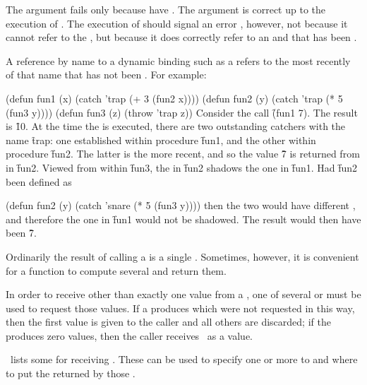 The argument fails only because  have 
.  The argument is correct up to the execution of
.  The execution of 
should signal an error , however, not
because it cannot refer to the , but because it
does correctly refer to an  and that 
 has been .

A reference by name to a dynamic  binding such as
a  refers to the most recently 
  of that name that has not been 
.  For example:

\code
 (defun fun1 (x)
   (catch 'trap (+ 3 (fun2 x))))
 (defun fun2 (y)
   (catch 'trap (* 5 (fun3 y))))
 (defun fun3 (z)
   (throw 'trap z))
\endcode
Consider the call \f{(fun1 7)}.  The result is \f{10}.  At the time
the  is executed, there are two outstanding catchers with the
name \f{trap}: one established within procedure \f{fun1}, and the other
within procedure \f{fun2}.  The latter is the more recent, and so the
value \f{7} is returned from  in \f{fun2}.
Viewed from within \f{fun3}, the  
in \f{fun2} shadows the one in \f{fun1}.
Had \f{fun2} been defined as

\code
 (defun fun2 (y)
   (catch 'snare (* 5 (fun3 y))))
\endcode
then the two  
would have different , and therefore the one
in \f{fun1} would not be shadowed.  The result would then have been \f{7}.

\endSubsection%


Ordinarily the result of calling a  is a single .
Sometimes, however, it is convenient for a function to compute several
 and return them.

In order to receive other than exactly one value from a ,
one of several  or  must be used to request those
values.  If a  produces  which were not
requested in this way, then the first value is given to the caller and
all others are discarded; if the  produces zero values,
then the caller receives \nil\ as a value.

\Thenextfigure\ lists 
some  for receiving .
These  can be used to specify 
    one or more  to  
and where to put the  returned by those .

